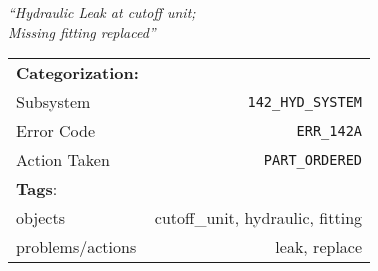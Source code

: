 \begin{tcolorbox}[
    title=Historical Record (MWO) Annotation Comparison,
    colback=block-gray
]
    \centering
    \textit{``Hydraulic Leak at cutoff unit;\\ Missing fitting replaced''}
    \tcblower
    \begin{tabular}{lr}
        \textbf{Categorization:} & \\
        \quad Subsystem & \texttt{142\_HYD\_SYSTEM}\\
        \quad Error Code & \texttt{ERR\_142A}\\
        \quad Action Taken & \texttt{PART\_ORDERED}\\
        \textbf{Tags}: & \\
        \quad objects & cutoff\_unit, hydraulic, fitting \\
        \quad problems/actions & leak, replace\\
    \end{tabular}
\end{tcolorbox}
